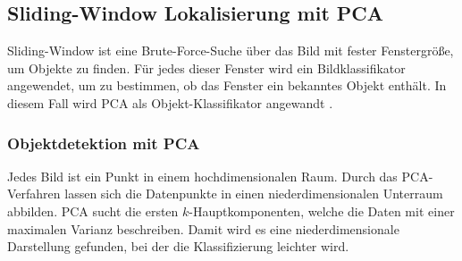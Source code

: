 \subsection{Sliding-Window Lokalisierung mit PCA}
Sliding-Window ist eine Brute-Force-Suche über das Bild mit fester Fenstergröße, um Objekte zu finden. Für jedes dieser Fenster wird ein Bildklassifikator angewendet, um zu bestimmen, ob das Fenster ein bekanntes Objekt enthält. In diesem Fall wird PCA als Objekt-Klassifikator angewandt \cite{belhumeur1997eigenfaces}.
\subsubsection{Objektdetektion mit PCA}
Jedes Bild ist ein Punkt in einem hochdimensionalen Raum. Durch das PCA-Verfahren lassen sich die Datenpunkte in einen niederdimensionalen Unterraum abbilden. PCA sucht die ersten $k$-Hauptkomponenten, welche die Daten mit einer maximalen Varianz beschreiben. Damit wird es eine niederdimensionale Darstellung gefunden, bei der die Klassifizierung leichter wird.\\

